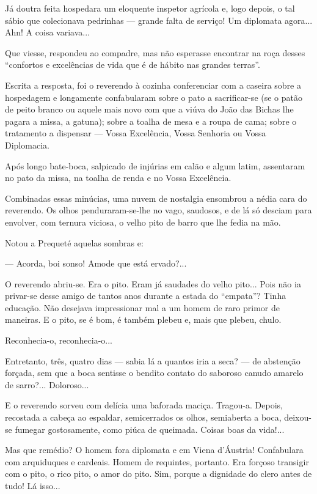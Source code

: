 Já doutra feita hospedara um eloquente inspetor agrícola e, logo depois,
o tal sábio que colecionava pedrinhas --- grande falta de serviço! Um
diplomata agora... Ahn! A coisa variava...

Que viesse, respondeu ao compadre, mas não esperasse encontrar na roça
desses ``confortos e excelências de vida que é de hábito nas grandes
terras''.

Escrita a resposta, foi o reverendo à cozinha conferenciar com a caseira
sobre a hospedagem e longamente confabularam sobre o pato a
sacrificar-se (se o patão de peito branco ou aquele mais novo com que a
viúva do João das Bichas lhe pagara a missa, a gatuna); sobre a toalha
de mesa e a roupa de cama; sobre o tratamento a dispensar --- Vossa
Excelência, Vossa Senhoria ou Vossa Diplomacia.

Após longo bate-boca, salpicado de injúrias em calão e algum latim,
assentaram no pato da missa, na toalha de renda e no Vossa Excelência.

Combinadas essas minúcias, uma nuvem de nostalgia ensombrou a nédia cara
do reverendo. Os olhos penduraram-se-lhe no vago, saudosos, e de lá só
desciam para envolver, com ternura viciosa, o velho pito de barro que
lhe fedia na mão.

Notou a Prequeté aquelas sombras e:

--- Acorda, boi sonso! Amode que está ervado?...

O reverendo abriu-se. Era o pito. Eram já saudades do velho pito... Pois
não ia privar-se desse amigo de tantos anos durante a estada do
``empata''? Tinha educação. Não desejava impressionar mal a um homem de
raro primor de maneiras. E o pito, se é bom, é também plebeu e, mais que
plebeu, chulo.

Reconhecia-o, reconhecia-o...

Entretanto, três, quatro dias --- sabia lá a quantos iria a seca? --- de
abstenção forçada, sem que a boca sentisse o bendito contato do saboroso
canudo amarelo de sarro?... Doloroso...

E o reverendo sorveu com delícia uma baforada maciça. Tragou-a. Depois,
recostada a cabeça ao espaldar, semicerrados os olhos, semiaberta a
boca, deixou-se fumegar gostosamente, como piúca de queimada. Coisas
boas da vida!...

Mas que remédio? O homem fora diplomata e em Viena d'Áustria!
Confabulara com arquiduques e cardeais. Homem de requintes, portanto.
Era forçoso transigir com o pito, o rico pito, o amor do pito. Sim,
porque a dignidade do clero antes de tudo! Lá isso...

